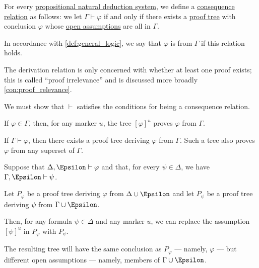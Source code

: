 \begin{definition}\label{def:propositional_natural_deduction_consequence}\mimprovised
  For every \hyperref[def:propositional_natural_deduction_system]{propositional natural deduction system}, we define a \hyperref[def:consequence_relation]{consequence relation} as follows: we let \( \Gamma \vdash \varphi \) if and only if there exists a \hyperref[def:propositional_natural_deduction_proof_tree]{proof tree} with conclusion \( \varphi \) whose \hyperref[def:propositional_natural_deduction_proof_tree/open_assumptions]{open assumptions} are all in \( \Gamma \).

  In accordance with \cref{def:general_logic}, we say that \( \varphi \) is  from \( \Gamma \) if this relation holds.
\end{definition}
\begin{comments}
  \item The derivation relation is only concerned with whether at least one proof exists; this is called \enquote{proof irrelevance} and is discussed more broadly \cref{con:proof_relevance}.
\end{comments}
\begin{defproof}
  We must show that \( {\vdash} \) satisfies the conditions for being a consequence relation.

   If \( \varphi \in \Gamma \), then, for any marker \( u \), the tree \( [\varphi]^u \) proves \( \varphi \) from \( \Gamma \).

   If \( \Gamma \vdash \varphi \), then there exists a proof tree deriving \( \varphi \) from \( \Gamma \). Such a tree also proves \( \varphi \) from any superset of \( \Gamma \).

   Suppose that \( \Delta, \Epsilon \vdash \varphi \) and that, for every \( \psi \in \Delta \), we have \( \Gamma, \Epsilon \vdash \psi \).

  Let \( P_\varphi \) be a proof tree deriving \( \varphi \) from \( \Delta \cup \Epsilon \) and let \( P_\psi \) be a proof tree deriving \( \psi \) from \( \Gamma \cup \Epsilon \).

  Then, for any formula \( \psi \in \Delta \) and any marker \( u \), we can replace the assumption \( [\psi]^u \) in \( P_\varphi \) with \( P_\psi \).

  The resulting tree will have the same conclusion as \( P_\varphi \) --- namely, \( \varphi \) --- but different open assumptions --- namely, members of \( \Gamma \cup \Epsilon \).
\end{defproof}

